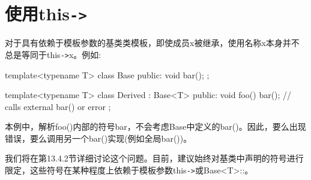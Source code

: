 \section{使用this\texttt{->}}
对于具有依赖于模板参数的基类类模板，即使成员x被继承，使用名称x本身并不总是等同于this\texttt{->}x。例如:

\begin{cpp}
template<typename T>
class Base {
public:
	void bar();
};

template<typename T>
class Derived : Base<T> {
public:
	void foo() {
		bar(); // calls external bar() or error
	}
};
\end{cpp}

本例中，解析foo()内部的符号bar，不会考虑Base中定义的bar()。因此，要么出现错误，要么调用另一个bar()实现(例如全局bar())。

我们将在第13.4.2节详细讨论这个问题。目前，建议始终对基类中声明的符号进行限定，这些符号在某种程度上依赖于模板参数this\texttt{->}或Base<T>::。














































